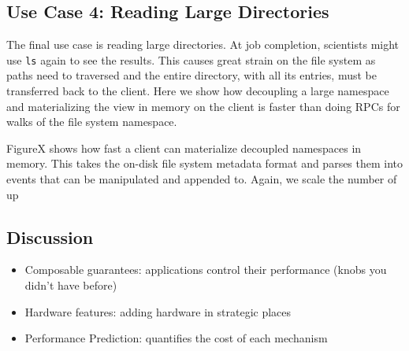 \subsection{Use Case 4: Reading Large Directories} 

The final use case is reading large directories. At job completion, scientists
might use \texttt{ls} again to see the results. This causes great strain on the
file system as paths need to traversed and the entire directory, with all its
entries, must be transferred back to the client. Here we show how decoupling a
large namespace and materializing the view in memory on the client is faster
than doing RPCs for walks of the file system namespace.

FigureX shows how fast a client can materialize decoupled namespaces in memory.
This takes the on-disk file system metadata format and parses them into events
that can be manipulated and appended to. Again, we scale the number of up

\subsection{Discussion}
\begin{itemize}
  \item Composable guarantees: applications control their performance (knobs you didn't have before)
  \item Hardware features: adding hardware in strategic places
  \item Performance Prediction: quantifies the cost of each mechanism
\end{itemize}
